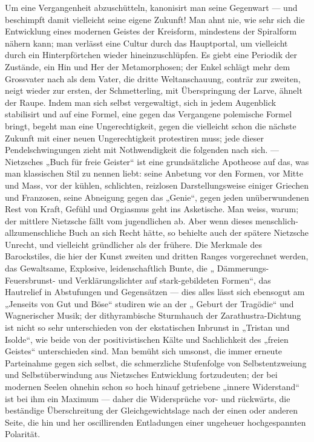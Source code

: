 Um eine Vergangenheit abzuschütteln, kanonisirt man seine Gegenwart — und beschimpft damit vielleicht seine eigene Zukunft! Man ahnt nie, wie sehr sich die Entwicklung eines modernen Geistes der Kreisform, mindestens der Spiralform nähern kann; man verlässt eine Cultur durch das Hauptportal, um vielleicht durch ein Hinterpförtchen wieder hineinzuschlüpfen. Es giebt eine Periodik der Zustände, ein Hin und Her der Metamorphosen; der Enkel schlägt mehr dem Grossvater nach als dem Vater, die dritte Weltanschauung, conträr zur zweiten, neigt wieder zur ersten, der Schmetterling, mit Überspringung der Larve, ähnelt der Raupe. Indem man sich selbst vergewaltigt, sich in jedem Augenblick stabilisirt und auf eine Formel, eine gegen das Vergangene polemische Formel bringt, begeht man eine Ungerechtigkeit, gegen die vielleicht schon die nächste Zukunft mit einer neuen Ungerechtigkeit protestiren muss; jede dieser Pendelschwingungen zieht mit Nothwendigkeit die folgenden nach sich. — Nietzsches „Buch für freie Geister“ ist eine grundsätzliche Apotheose auf das, was man klassischen Stil zu nennen liebt: seine Anbetung vor den Formen, vor Mitte und Mass, vor der kühlen, schlichten, reizlosen Darstellungsweise einiger Griechen und Franzosen, seine Abneigung gegen das „Genie“, gegen jeden unüberwundenen Rest von Kraft, Gefühl und Orgiasmus geht ins Asketische. Man weiss, warum; der mittlere Nietzsche fällt vom jugendlichen ab. Aber wenn dieses menschlich-allzumenschliche Buch an sich Recht hätte, so behielte auch der spätere Nietzsche Unrecht, und vielleicht gründlicher als der frühere. Die Merkmale des Barockstiles, die hier der Kunst zweiten und dritten Ranges vorgerechnet werden, das Gewaltsame, Explosive, leidenschaftlich Bunte, die „ Dämmerungs- Feuersbrunst- und Verklärungslichter auf stark-gebildeten Formen“, das Hautrelief in Abstufungen und Gegensätzen — dies alles lässt sich ebensogut am „Jenseits von Gut und Böse“ studiren wie an der „ Geburt der Tragödie“ und Wagnerischer Musik; der dithyrambische Sturmhauch der Zarathustra-Dichtung ist nicht so sehr unterschieden von der ekstatischen Inbrunst in „Tristan und Isolde“, wie beide von der positivistischen Kälte und Sachlichkeit des „freien Geistes“ unterschieden sind. Man bemüht sich umsonst, die immer erneute Parteinahme gegen sich selbst, die schmerzliche Stufenfolge von Selbstentzweiung und Selbstüberwindung aus Nietzsches Entwicklung fortzudeuten; der bei modernen Seelen ohnehin schon so hoch hinauf getriebene „innere Widerstand“ ist bei ihm ein Maximum — daher die Widersprüche vor- und rückwärts, die beständige Überschreitung der Gleichgewichtslage nach der einen oder anderen Seite, die hin und her oscillirenden Entladungen einer ungeheuer hochgespannten Polarität.
\par

